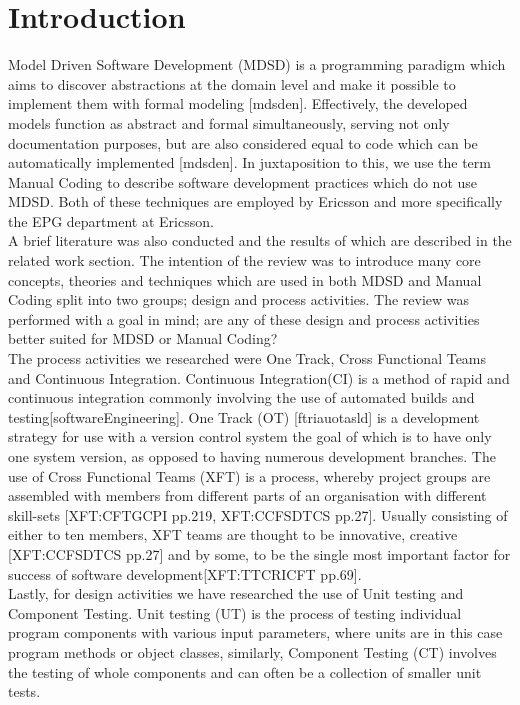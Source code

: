 \documentclass[fina_report_innit.tex]{subfiles}
\begin{document}
\section{Introduction}

Model Driven Software Development (MDSD) is a programming paradigm which aims to discover abstractions at the domain level and make it possible to implement them with formal modeling [mdsden]. Effectively, the developed models function as abstract and formal simultaneously, serving not only documentation purposes, but are also considered equal to code which can be automatically implemented [mdsden]. In juxtaposition to this, we use the term Manual Coding to describe software development practices which do not use MDSD. Both of these techniques are employed by Ericsson and more specifically the EPG department at Ericsson.
\\

A brief literature was also conducted and the results of which are described in the related work section. The intention of the review was to introduce many core concepts, theories and techniques which are used in both MDSD and Manual Coding split into two groups; design and process activities. The review was performed with a goal in mind; are any of these design and process activities better suited for MDSD or Manual Coding?
\\

The process activities we researched were One Track, Cross Functional Teams and Continuous Integration. Continuous Integration(CI) is a method of rapid and continuous integration commonly involving the use of automated builds and testing[softwareEngineering]. One Track (OT) [ftriauotasld] is a development strategy for use with a version control system the goal of which is to have only one system version, as opposed to having numerous development branches. The use of Cross Functional Teams (XFT) is a process, whereby project groups are assembled with members from different parts of an organisation with different skill-sets [XFT:CFTGCPI pp.219, XFT:CCFSDTCS pp.27]. Usually consisting of either to ten members, XFT teams are thought to be innovative, creative [XFT:CCFSDTCS pp.27] and by some, to be the single most important factor for success of software development[XFT:TTCRICFT pp.69].
\\

Lastly, for design activities we have researched the use of Unit testing and Component Testing. Unit testing (UT) is the process of testing individual program components with various input parameters, where units are in this case program methods or object classes, similarly, Component Testing (CT) involves the testing of whole components and can often be a collection of smaller unit tests.
\\
\end{document}
